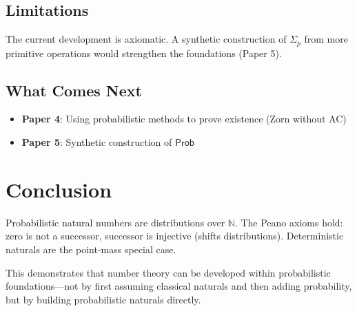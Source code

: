 \documentclass[11pt,a4paper]{article}
\newcommand{\Prob}{\mathsf{Prob}}
\newcommand{\psum}{\Sigma_p}
\newcommand{\Nat}{\mathbb{N}}
\begin{document}
\subsection{Limitations}

The current development is axiomatic. A synthetic construction of $\psum$ from more primitive operations would strengthen the foundations (Paper 5).

\subsection{What Comes Next}

\begin{itemize}
    \item \textbf{Paper 4}: Using probabilistic methods to prove existence (Zorn without AC)
    \item \textbf{Paper 5}: Synthetic construction of $\Prob$
\end{itemize}

\section{Conclusion}

Probabilistic natural numbers are distributions over $\Nat$. The Peano axioms hold: zero is not a successor, successor is injective (shifts distributions). Deterministic naturals are the point-mass special case.

This demonstrates that number theory can be developed within probabilistic foundations---not by first assuming classical naturals and then adding probability, but by building probabilistic naturals directly.


\end{document}
